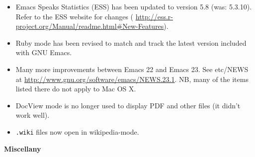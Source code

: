 \begin{itemize}
\item Emacs Speaks Statistics (ESS) has been updated to version 5.8 (was: 5.3.10).  Refer to the ESS website for changes ({\small{ \url{http://ess.r-project.org/Manual/readme.html#New-Features}}}).

\item Ruby mode has been revised to match and track the latest version included with GNU Emacs.

\item Many more improvements between Emacs 22 and Emacs 23. See etc/NEWS at \url{http://www.gnu.org/software/emacs/NEWS.23.1}.  NB, many of the items listed there do not apply to Mac OS X.

\item DocView mode is no longer used to display PDF and other files (it didn't work well).

\item {\tt .wiki} files now open in wikipedia-mode.

\end{itemize}


\textbf
{Miscellany}

